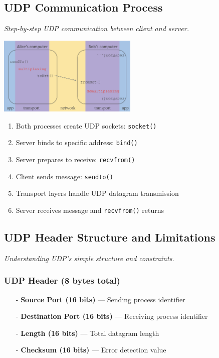 \documentclass[../../compsys.tex]{subfiles}
\begin{document}
\subsection{UDP Communication Process}
\textit{Step-by-step UDP communication between client and server.}

\begin{center}
  \includegraphics[width=0.5\textwidth]{images/udp.png}
\end{center}

\begin{enumerate}
  \item Both processes create UDP sockets: \texttt{socket()}
  \item Server binds to specific address: \texttt{bind()}
  \item Server prepares to receive: \texttt{recvfrom()}
  \item Client sends message: \texttt{sendto()}
  \item Transport layers handle UDP datagram transmission
  \item Server receives message and \texttt{recvfrom()} returns
\end{enumerate}

\subsection{UDP Header Structure and Limitations}
\textit{Understanding UDP's simple structure and constraints.}

\subsubsection{UDP Header (8 bytes total)}
\begin{itemize}
  \item[-] \textbf{Source Port (16 bits)} — Sending process identifier
  \item[-] \textbf{Destination Port (16 bits)} — Receiving process identifier  
  \item[-] \textbf{Length (16 bits)} — Total datagram length
  \item[-] \textbf{Checksum (16 bits)} — Error detection value
\end{itemize}
\end{document}
